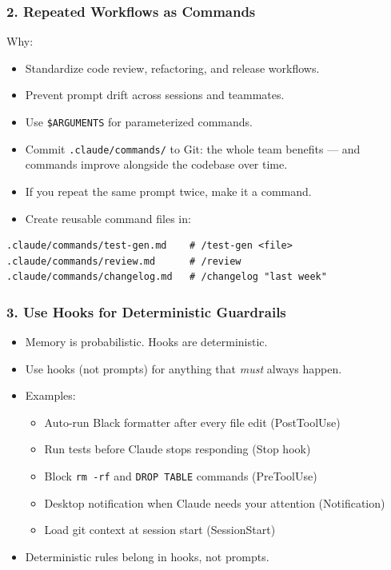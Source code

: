 \begin{frame}[fragile]\frametitle{2. Repeated Workflows as Commands}

Why:
  \begin{itemize}
    \item Standardize code review, refactoring, and release workflows.
    \item Prevent prompt drift across sessions and teammates.
    \item Use \texttt{\$ARGUMENTS} for parameterized commands.
    \item Commit \texttt{.claude/commands/} to Git: the whole team benefits --- and commands improve alongside the codebase over time.
  \end{itemize}

  \begin{itemize}
    \item If you repeat the same prompt twice, make it a command.
    \item Create reusable command files in:
  \end{itemize}

\begin{lstlisting}
.claude/commands/test-gen.md    # /test-gen <file>
.claude/commands/review.md      # /review
.claude/commands/changelog.md   # /changelog "last week"
\end{lstlisting}


\end{frame}

\begin{frame}[fragile]\frametitle{3. Use Hooks for Deterministic Guardrails}
  \begin{itemize}
    \item Memory is probabilistic. Hooks are deterministic.
    \item Use hooks (not prompts) for anything that \textit{must} always happen.
    \item Examples:
    \begin{itemize}
        \item Auto-run Black formatter after every file edit (PostToolUse)
        \item Run tests before Claude stops responding (Stop hook)
        \item Block \texttt{rm -rf} and \texttt{DROP TABLE} commands (PreToolUse)
        \item Desktop notification when Claude needs your attention (Notification)
        \item Load git context at session start (SessionStart)
    \end{itemize}
    \item Deterministic rules belong in hooks, not prompts.
  \end{itemize}
\end{frame}

